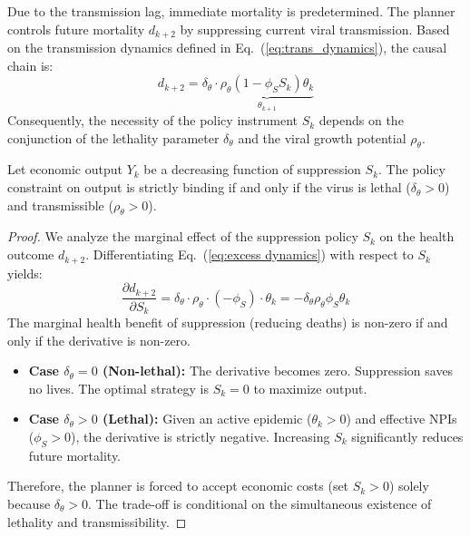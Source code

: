 \documentclass[12pt, a4paper]{article}
\begin{document}
Due to the transmission lag, immediate mortality is predetermined. The planner controls future mortality $d_{k+2}$ by suppressing current viral transmission. Based on the transmission dynamics defined in Eq.~(\ref{eq:trans_dynamics}), the causal chain is:
\begin{equation}
    d_{k+2} = \delta_\theta \cdot \underbrace{\rho_\theta (1 - \phi_S S_k) \theta_k}_{\theta_{k+1}}
    \label{eq:excess dynamics}
\end{equation}
Consequently, the necessity of the policy instrument $S_k$ depends on the conjunction of the lethality parameter $\delta_\theta$ and the viral growth potential $\rho_\theta$.

Let economic output $Y_k$ be a decreasing function of suppression $S_k$. The policy constraint on output is strictly binding if and only if the virus is lethal ($\delta_\theta > 0$) and transmissible ($\rho_\theta > 0$).


\begin{proof}
    We analyze the marginal effect of the suppression policy $S_k$ on the health outcome $d_{k+2}$. Differentiating Eq.~(\ref{eq:excess dynamics}) with respect to $S_k$ yields:
    \begin{equation}
        \frac{\partial d_{k+2}}{\partial S_k} = \delta_\theta \cdot \rho_\theta \cdot (-\phi_S) \cdot \theta_k = - \delta_\theta \rho_\theta \phi_S \theta_k
    \end{equation}
    The marginal health benefit of suppression (reducing deaths) is non-zero if and only if the derivative is non-zero.
    \begin{itemize}
        \item \textbf{Case $\delta_\theta = 0$ (Non-lethal):} The derivative becomes zero. Suppression saves no lives. The optimal strategy is $S_k=0$ to maximize output.
        \item \textbf{Case $\delta_\theta > 0$ (Lethal):} Given an active epidemic ($\theta_k > 0$) and effective NPIs ($\phi_S > 0$), the derivative is strictly negative. Increasing $S_k$ significantly reduces future mortality.
    \end{itemize}
    Therefore, the planner is forced to accept economic costs (set $S_k > 0$) solely because $\delta_\theta > 0$. The trade-off is conditional on the simultaneous existence of lethality and transmissibility.
\end{proof}


\end{document}
